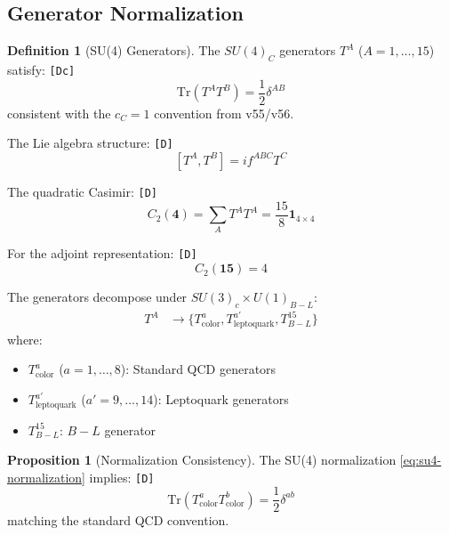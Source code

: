\documentclass[11pt,a4paper]{article}
\newcommand{\tagD}{\textcolor{green!50!black}{\texttt{[D]}}}
\newcommand{\tagDc}{\textcolor{blue!70!black}{\texttt{[Dc]}}}
\theoremstyle{definition}
\newtheorem{definition}{Definition}[section]
\newtheorem{proposition}[theorem]{Proposition}
\begin{document}
\subsection{Generator Normalization}
\label{subsec:generators}

\begin{definition}[SU(4) Generators]
\label{def:su4-generators}
The $SU(4)_C$ generators $T^A$ ($A = 1, \ldots, 15$) satisfy: \tagDc{}
\begin{equation}
\label{eq:su4-normalization}
\boxed{\text{Tr}(T^A T^B) = \frac{1}{2} \delta^{AB}}
\end{equation}
consistent with the $c_C = 1$ convention from v55/v56.
\end{definition}

The Lie algebra structure: \tagD{}
\begin{equation}
\label{eq:su4-commutator}
[T^A, T^B] = i f^{ABC} T^C
\end{equation}

The quadratic Casimir: \tagD{}
\begin{equation}
\label{eq:casimir-fundamental}
C_2(\mathbf{4}) = \sum_A T^A T^A = \frac{15}{8} \mathbf{1}_{4\times 4}
\end{equation}

For the adjoint representation: \tagD{}
\begin{equation}
\label{eq:casimir-adjoint}
C_2(\mathbf{15}) = 4
\end{equation}

The generators decompose under $SU(3)_c \times U(1)_{B-L}$:
\begin{align}
\label{eq:generator-decomposition}
T^A &\to \{T^a_{\text{color}}, T^{a'}_{\text{leptoquark}}, T^{15}_{B-L}\}
\end{align}
where:
\begin{itemize}
  \item $T^a_{\text{color}}$ ($a = 1, \ldots, 8$): Standard QCD generators
  \item $T^{a'}_{\text{leptoquark}}$ ($a' = 9, \ldots, 14$): Leptoquark generators
  \item $T^{15}_{B-L}$: $B - L$ generator
\end{itemize}

\begin{proposition}[Normalization Consistency]
\label{prop:normalization}
The SU(4) normalization \eqref{eq:su4-normalization} implies: \tagD{}
\begin{equation}
\label{eq:color-normalization}
\text{Tr}(T^a_{\text{color}} T^b_{\text{color}}) = \frac{1}{2} \delta^{ab}
\end{equation}
matching the standard QCD convention.
\end{proposition}
\end{document}
